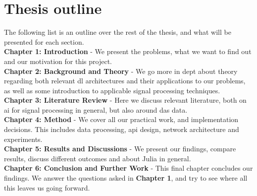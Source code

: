 \section{Thesis outline}

The following list is an outline over the rest of the thesis, and what will be presented for each section. \\

\textbf{Chapter 1: Introduction} - We present the problems, what we want to find out and our motivation for this project. \\

\textbf{Chapter 2: Background and Theory} - We go more in dept about theory regarding both relevant \acrshort{dl} architectures and their applications to our problems, as well as some introduction to applicable signal processing techniques.  \\

\textbf{Chapter 3: Literature Review} - Here we discuss relevant literature, both on \acrshort{ai} for signal processing in general, but also around \acrshort{das} data. \\

\textbf{Chapter 4: Method} - We cover all our practical work, and implementation decisions. This includes data processing, \acrshort{api} design, network architecture and experiments. \\

\textbf{Chapter 5: Results and Discussions} - We present our findings, compare results, discuss different outcomes and about Julia in general. \\

\textbf{Chapter 6: Conclusion and Further Work} - This final chapter concludes our findings. We answer the questions asked in \textbf{Chapter 1}, and try to see where all this leaves us going forward. \\
